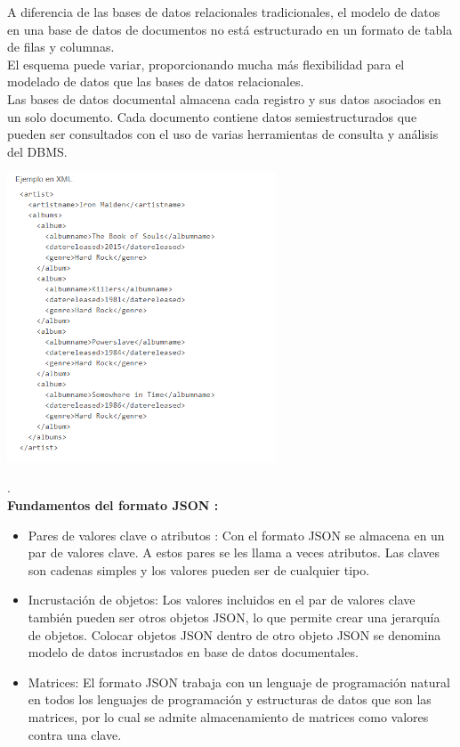 \documentclass[%
 reprint,
 amsmath,amssymb,
 aps,
]{revtex4-1}
\begin{document}
A diferencia de las bases de datos relacionales tradicionales, el modelo de datos en una base de datos de documentos no está estructurado en un formato de tabla de filas y columnas.\\

El esquema puede variar, proporcionando mucha más flexibilidad para el modelado de datos que las bases de datos relacionales.\\

Las bases de datos documental almacena cada registro y sus datos asociados en un solo documento. Cada documento contiene datos semiestructurados que pueden ser consultados con el uso de varias herramientas de consulta y análisis del DBMS.
\begin{center}
	\includegraphics[width=8cm]{./Imagenes/documental1}
\end{center}	
.\\
\textbf{Fundamentos del formato JSON :}
\begin{itemize}
		\item Pares de valores clave o atributos :  Con el formato JSON se almacena en un par de valores clave. A estos pares se les llama a veces atributos. Las claves son cadenas simples y los valores pueden ser de cualquier tipo.
		\item Incrustación de objetos: Los valores incluidos en el par de valores clave también pueden ser otros objetos JSON, lo que permite crear una jerarquía de objetos. Colocar objetos JSON dentro de otro objeto JSON se denomina modelo de datos incrustados en base de datos documentales.
		\item Matrices: El formato JSON trabaja con un lenguaje de programación natural en todos los lenguajes de programación y estructuras de datos que son las matrices, por lo cual se admite almacenamiento de matrices como valores contra una clave. 
\end{itemize}
\end{document}
